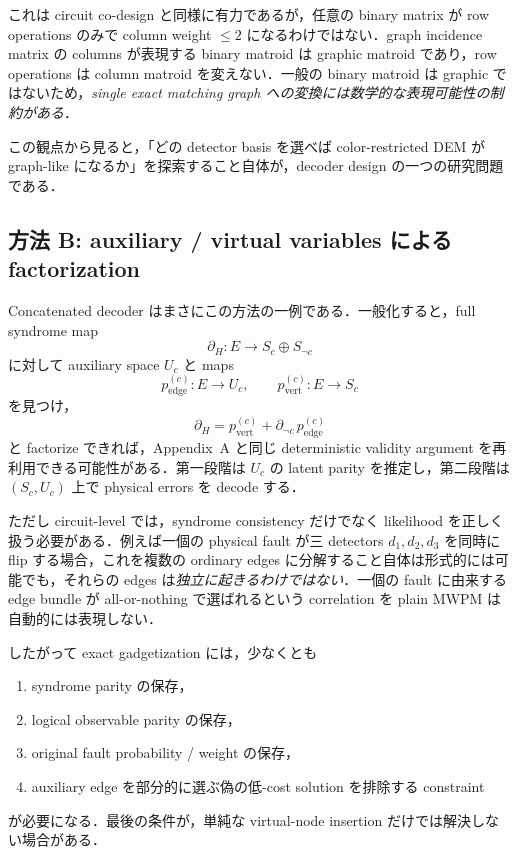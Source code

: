 \documentclass[a4paper,11pt]{ltjsarticle}
\newcommand{\bd}{\partial}
\begin{document}
これは circuit co-design と同様に有力であるが，任意の binary matrix が row operations のみで column weight $\le2$ になるわけではない．graph incidence matrix の columns が表現する binary matroid は graphic matroid であり，row operations は column matroid を変えない．一般の binary matroid は graphic ではないため，\emph{single exact matching graph への変換には数学的な表現可能性の制約がある}．

この観点から見ると，「どの detector basis を選べば color-restricted DEM が graph-like になるか」を探索すること自体が，decoder design の一つの研究問題である．

\subsection{方法 B: auxiliary / virtual variables による factorization}

Concatenated decoder はまさにこの方法の一例である．一般化すると，full syndrome map
\begin{equation}
  \bd_H:E\to S_c\oplus S_{\neg c}
\end{equation}
に対して auxiliary space $U_c$ と maps
\begin{equation}
 p_{\mathrm{edge}}^{(c)}:E\to U_c,
 \qquad
 p_{\mathrm{vert}}^{(c)}:E\to S_c
\end{equation}
を見つけ，
\begin{equation}
 \bd_H
 =p_{\mathrm{vert}}^{(c)}
 +\bd_{\neg c}\,p_{\mathrm{edge}}^{(c)}
 \label{eq:general-factorization}
\end{equation}
と factorize できれば，Appendix~A と同じ deterministic validity argument を再利用できる可能性がある．第一段階は $U_c$ の latent parity を推定し，第二段階は $(S_c,U_c)$ 上で physical errors を decode する．

ただし circuit-level では，syndrome consistency だけでなく likelihood を正しく扱う必要がある．例えば一個の physical fault が三 detectors $d_1,d_2,d_3$ を同時に flip する場合，これを複数の ordinary edges に分解すること自体は形式的には可能でも，それらの edges は\emph{独立に起きるわけではない}．一個の fault に由来する edge bundle が all-or-nothing で選ばれるという correlation を plain MWPM は自動的には表現しない．

したがって exact gadgetization には，少なくとも
\begin{enumerate}
  \item syndrome parity の保存，
  \item logical observable parity の保存，
  \item original fault probability / weight の保存，
  \item auxiliary edge を部分的に選ぶ偽の低-cost solution を排除する constraint
\end{enumerate}
が必要になる．最後の条件が，単純な virtual-node insertion だけでは解決しない場合がある．
\end{document}

